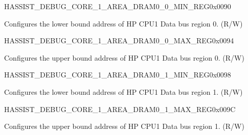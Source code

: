 \begin{register}{H}{ASSIST\_DEBUG\_CORE\_1\_AREA\_DRAM0\_0\_MIN\_REG}{0x0090}\label{regdesc:ASSISTDEBUGCORE1AREADRAM00MINREG}
%
\regnewline%
\begin{regdesc}\begin{reglist}
\label{fielddesc:ASSISTDEBUGCORE1AREADRAM00MIN}\item [ASSIST\_DEBUG\_CORE\_1\_AREA\_DRAM0\_0\_MIN] Configures the lower bound address of HP CPU1 Data bus region 0. (R/W)
\end{reglist}\end{regdesc}
\end{register}


\begin{register}{H}{ASSIST\_DEBUG\_CORE\_1\_AREA\_DRAM0\_0\_MAX\_REG}{0x0094}\label{regdesc:ASSISTDEBUGCORE1AREADRAM00MAXREG}
%
\regnewline%
\begin{regdesc}\begin{reglist}
\label{fielddesc:ASSISTDEBUGCORE1AREADRAM00MAX}\item [ASSIST\_DEBUG\_CORE\_1\_AREA\_DRAM0\_0\_MAX] Configures the upper bound address of HP CPU1 Data bus region 0. (R/W)
\end{reglist}\end{regdesc}
\end{register}


\begin{register}{H}{ASSIST\_DEBUG\_CORE\_1\_AREA\_DRAM0\_1\_MIN\_REG}{0x0098}\label{regdesc:ASSISTDEBUGCORE1AREADRAM01MINREG}
%
\regnewline%
\begin{regdesc}\begin{reglist}
\label{fielddesc:ASSISTDEBUGCORE1AREADRAM01MIN}\item [ASSIST\_DEBUG\_CORE\_1\_AREA\_DRAM0\_1\_MIN] Configures the lower bound address of HP CPU1 Data bus region 1. (R/W)
\end{reglist}\end{regdesc}
\end{register}


\begin{register}{H}{ASSIST\_DEBUG\_CORE\_1\_AREA\_DRAM0\_1\_MAX\_REG}{0x009C}\label{regdesc:ASSISTDEBUGCORE1AREADRAM01MAXREG}
%
\regnewline%
\begin{regdesc}\begin{reglist}
\label{fielddesc:ASSISTDEBUGCORE1AREADRAM01MAX}\item [ASSIST\_DEBUG\_CORE\_1\_AREA\_DRAM0\_1\_MAX] Configures the upper bound address of HP CPU1 Data bus region 1. (R/W)
\end{reglist}\end{regdesc}
\end{register}



